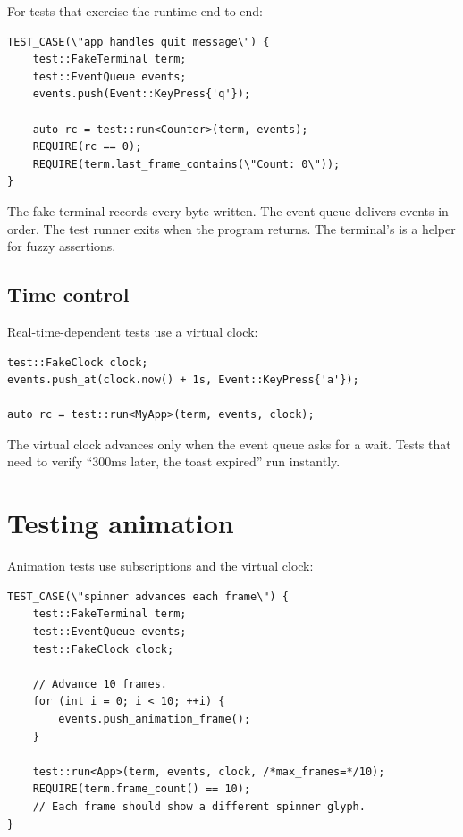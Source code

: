 For tests that exercise the runtime end-to-end:

\begin{lstlisting}
TEST_CASE(\"app handles quit message\") {
    test::FakeTerminal term;
    test::EventQueue events;
    events.push(Event::KeyPress{'q'});

    auto rc = test::run<Counter>(term, events);
    REQUIRE(rc == 0);
    REQUIRE(term.last_frame_contains(\"Count: 0\"));
}
\end{lstlisting}

The fake terminal records every byte written. The event queue
delivers events in order. The test runner exits when the program
returns. The terminal's  is a
helper for fuzzy assertions.

\subsection*{Time control}

Real-time-dependent tests use a virtual clock:

\begin{lstlisting}
test::FakeClock clock;
events.push_at(clock.now() + 1s, Event::KeyPress{'a'});

auto rc = test::run<MyApp>(term, events, clock);
\end{lstlisting}

The virtual clock advances only when the event queue asks for
a wait. Tests that need to verify ``300ms later, the toast
expired'' run instantly.

\section{Testing animation}

Animation tests use  subscriptions and
the virtual clock:

\begin{lstlisting}
TEST_CASE(\"spinner advances each frame\") {
    test::FakeTerminal term;
    test::EventQueue events;
    test::FakeClock clock;

    // Advance 10 frames.
    for (int i = 0; i < 10; ++i) {
        events.push_animation_frame();
    }

    test::run<App>(term, events, clock, /*max_frames=*/10);
    REQUIRE(term.frame_count() == 10);
    // Each frame should show a different spinner glyph.
}
\end{lstlisting}

